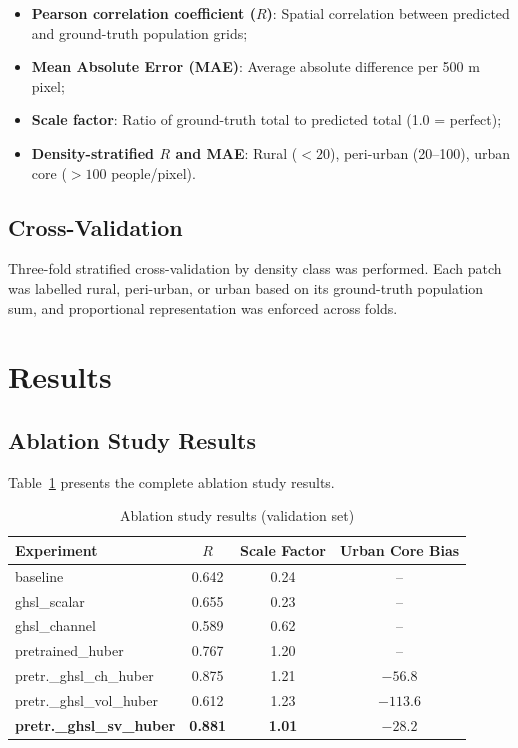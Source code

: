\documentclass[12pt,a4paper]{article}
\begin{document}
\begin{itemize}
    \item \textbf{Pearson correlation coefficient ($R$)}: Spatial correlation between predicted and ground-truth population grids;
    \item \textbf{Mean Absolute Error (MAE)}: Average absolute difference per 500 m pixel;
    \item \textbf{Scale factor}: Ratio of ground-truth total to predicted total (1.0 = perfect);
    \item \textbf{Density-stratified $R$ and MAE}: Rural ($< 20$), peri-urban (20--100), urban core ($> 100$ people/pixel).
\end{itemize}

\subsection{Cross-Validation}
\label{subsec:cv}

Three-fold stratified cross-validation by density class was performed. Each patch was labelled rural, peri-urban, or urban based on its ground-truth population sum, and proportional representation was enforced across folds.

\section{Results}
\label{sec:results}

\subsection{Ablation Study Results}
\label{subsec:ablation}

Table~\ref{tab:ablation_results} presents the complete ablation study results.

\begin{table}[H]
\centering
\caption{Ablation study results (validation set)}
\label{tab:ablation_results}
\begin{tabular}{@{}lccc@{}}
\toprule
\textbf{Experiment} & \textbf{$R$} & \textbf{Scale Factor} & \textbf{Urban Core Bias} \\
\midrule
baseline & 0.642 & 0.24 & -- \\
ghsl\_scalar & 0.655 & 0.23 & -- \\
ghsl\_channel & 0.589 & 0.62 & -- \\
pretrained\_huber & 0.767 & 1.20 & -- \\
pretr.\_ghsl\_ch\_huber & 0.875 & 1.21 & $-56.8$ \\
pretr.\_ghsl\_vol\_huber & 0.612 & 1.23 & $-113.6$ \\
\textbf{pretr.\_ghsl\_sv\_huber} & \textbf{0.881} & \textbf{1.01} & $\mathbf{-28.2}$ \\
\bottomrule
\end{tabular}
\end{table}
\end{document}
